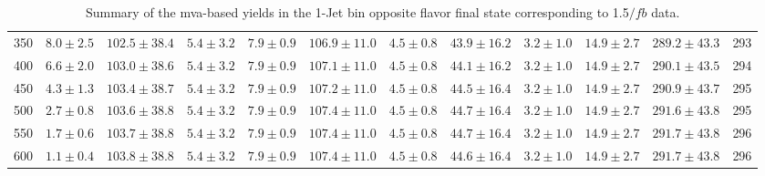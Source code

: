 \begin{table}
{\begin{center}
\begin{tabular}{l c c c c c c c c c c c }
350 & $8.0\pm2.5$ & $102.5\pm38.4$ & $5.4\pm3.2$ & $7.9\pm0.9$ & $106.9\pm11.0$ & $4.5\pm0.8$ & $43.9\pm16.2$ & $3.2\pm1.0$ & $14.9\pm2.7$ & $289.2\pm43.3$ & 293 \\
400 & $6.6\pm2.0$ & $103.0\pm38.6$ & $5.4\pm3.2$ & $7.9\pm0.9$ & $107.1\pm11.0$ & $4.5\pm0.8$ & $44.1\pm16.2$ & $3.2\pm1.0$ & $14.9\pm2.7$ & $290.1\pm43.5$ & 294 \\
450 & $4.3\pm1.3$ & $103.4\pm38.7$ & $5.4\pm3.2$ & $7.9\pm0.9$ & $107.2\pm11.0$ & $4.5\pm0.8$ & $44.5\pm16.4$ & $3.2\pm1.0$ & $14.9\pm2.7$ & $290.9\pm43.7$ & 295 \\
500 & $2.7\pm0.8$ & $103.6\pm38.8$ & $5.4\pm3.2$ & $7.9\pm0.9$ & $107.4\pm11.0$ & $4.5\pm0.8$ & $44.7\pm16.4$ & $3.2\pm1.0$ & $14.9\pm2.7$ & $291.6\pm43.8$ & 295 \\
550 & $1.7\pm0.6$ & $103.7\pm38.8$ & $5.4\pm3.2$ & $7.9\pm0.9$ & $107.4\pm11.0$ & $4.5\pm0.8$ & $44.7\pm16.4$ & $3.2\pm1.0$ & $14.9\pm2.7$ & $291.7\pm43.8$ & 296 \\
600 & $1.1\pm0.4$ & $103.8\pm38.8$ & $5.4\pm3.2$ & $7.9\pm0.9$ & $107.4\pm11.0$ & $4.5\pm0.8$ & $44.6\pm16.4$ & $3.2\pm1.0$ & $14.9\pm2.7$ & $291.7\pm43.8$ & 296 \\
\hline
\end{tabular}
\end{center}
}
\caption{Summary of the mva-based yields in the 1-Jet bin opposite flavor final state corresponding to 1.5$/fb$ data.}
\end{table}
